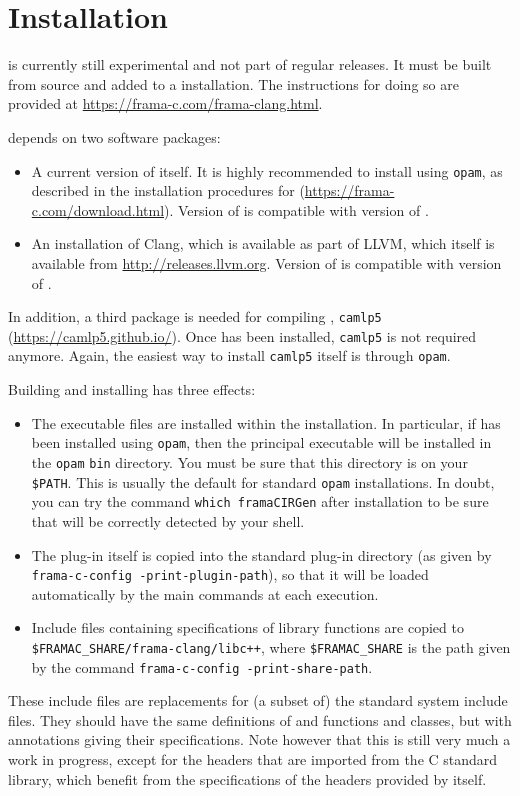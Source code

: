 \chapter{Installation}

\fclang is currently still experimental and not part of regular \framac releases. It must be built from source and added to a \framac installation.
The instructions for doing so are provided at 
\url{https://frama-c.com/frama-clang.html}.

\fclang depends on two software packages:
\begin{itemize}
\item A current version of \framac itself. It is highly recommended to install \framac using \lstinline|opam|, as described in the installation procedures for \framac (\url{https://frama-c.com/download.html}). 
Version \fclangversion of \fclang is compatible with version \fcversion of \framac.
\item An installation of Clang, which is available as part of LLVM,
which itself is available from \url{http://releases.llvm.org}.
Version \fclangversion of \fclang is compatible with version \clangversion of \clang.
\end{itemize}

In addition, a third package is needed for compiling \fclang,
\lstinline|camlp5| (\url{https://camlp5.github.io/}).
Once \fclang has been installed, \lstinline|camlp5| is not required anymore.
Again, the easiest way to install
\lstinline|camlp5| itself is through \lstinline|opam|.

Building and installing \fclang has three effects:
\begin{itemize}
\item The \fclang executable files are installed within
the \framac installation.
In particular, if \framac has been installed using \lstinline|opam|,
then the principal executable  \irg will be installed in the
\lstinline|opam| \lstinline|bin| directory.
You must be sure that this directory is on your \verb|$PATH|.
This is usually the default for standard \lstinline|opam| installations.
In doubt, you can try the command \lstinline|which framaCIRGen|
after installation to be sure that \irg will be correctly detected by your
shell.
\item The \framac plug-in itself is copied into the standard \framac plug-in
directory (as given by \lstinline|frama-c-config -print-plugin-path|), so
that it will be loaded automatically by the main \framac commands at each
execution.
\item Include files containing \acslpp specifications of \cpp library functions
are copied to
\verb|$FRAMAC_SHARE/frama-clang/libc++|, where \verb|$FRAMAC_SHARE| is the path
given by the command \lstinline|frama-c-config -print-share-path|.
\end{itemize}
These include files are replacements for (a subset of)
the standard system include files. They should have the same definitions of
\C and \cpp functions and classes, but
with \acslpp annotations giving their specifications. Note however that this is
still very much a work in progress, except for the headers that are imported
from the C standard library, which benefit from the specifications of the
headers provided by \framac itself.


